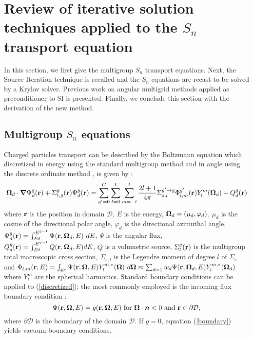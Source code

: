 \section{Review of iterative solution techniques applied to the $S_n$
transport equation}
In this section, we first give the multigroup $S_n$ transport equations. Next,
the Source Iteration technique is recalled and the $S_n$ equations are
recast to be solved by a Krylov solver. Previous work on angular
multigrid methods applied as preconditioner to SI is presented. Finally, we
conclude this section with the derivation of the new method.  
\subsection{Multigroup $S_n$ equations} 
Charged particles transport can be described by the Boltzmann equation
\cite{graal} which discretized in energy using the standard multigroup method
\cite{reuss} and in angle using the discrete ordinate method \cite{reuss}, is
given by :
\begin{equation}
\boldsymbol{\Omega}_d \cdot \boldsymbol{\nabla} \Psi_d^g(\mathbf{r}) + \Sigma_{t,g}^g(\mathbf{r}) \Psi_d^g(\mathbf{r}) = \sum_{g'=0}^G
\sum_{l=0}^L\sum_{m=-l}^l \frac{2l+1}{4\pi}\Sigma_{s,l}^{g'\rightarrow
g}\Phi_{l,m}^{g'}(\mathbf{r})Y_l^m(\boldsymbol{\Omega}_d) + Q_d^g(\mathbf{r})
\label{discretized}
\end{equation}
where $\mathbf{r}$ is the position in domain $\mathcal{D}$, $E$ is the energy,
$\boldsymbol{\Omega}_d=(\mu_d,\varphi_d)$, $\mu_d$ is the cosine of the directional polar angle,
$\varphi_d$ is the directional azimuthal angle, 
$\Psi_d^g(\br)=\int_{E^{g}}^{E^{g-1}}\Psi(\br,\bo_d,E)\ dE$, $\Psi$ is
the angular flux, $Q_d^g(\mathbf{r}) = \int_{E^g}^{E^{g-1}}Q(\mathbf{r},\boldsymbol{\Omega}_d,E) dE$, $Q$ is
a volumetric source, $\Sigma_{t}^g(\mathbf{r})$ is the multigroup total 
macroscopic cross section, $\Sigma_{s,l}$ is the Legendre moment of 
degree $l$ of $\Sigma_s$ and $\Phi_{l,m}(\mathbf{r},E)= \int_{4\pi}\Psi(\mathbf{r},\boldsymbol{\Omega},E)Y_l^{m,*}(\boldsymbol{\Omega})\ d\boldsymbol{\Omega}
\approx \sum_{d=1} w_d \Psi(\mathbf{r},\boldsymbol{\Omega}_d,E)Y_l^{m,*}(\boldsymbol{\Omega}_d)$ where $Y_l^m$ 
are the spherical harmonics.
Standard boundary conditions can be applied to (\ref{discretized}); the most
commonly employed is the incoming flux boundary condition :
\begin{equation}
\Psi(\mathbf{r},\boldsymbol{\Omega},E) = g(\mathbf{r},\boldsymbol{\Omega},E)\textrm{ for }\boldsymbol{\Omega}\cdot\boldsymbol{n}<0\textrm{ and
}\mathbf{r}\in \partial \mathcal{D},
\label{boundary}
\end{equation} 
where $\partial \mathcal{D}$ is the boundary of the domain $\mathcal{D}$. If $g=0$, equation
(\ref{boundary}) yields vacuum boundary conditions.\\

